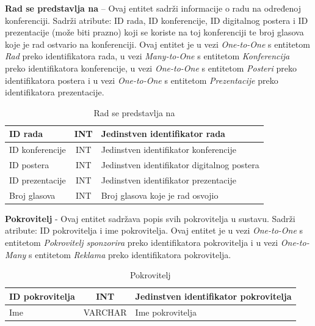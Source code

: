 \textbf{Rad se predstavlja na} – Ovaj entitet sadrži informacije o radu na određenoj konferenciji. Sadrži atribute: ID rada, ID konferencije, ID digitalnog postera i ID prezentacije (može biti prazno) koji se koriste na toj konferenciji te broj glasova koje je rad ostvario na konferenciji. Ovaj entitet je u vezi \textit{One-to-One} s entitetom \textit{Rad} preko identifikatora rada, u vezi \textit{Many-to-One} s entitetom \textit{Konferencija} preko identifikatora konferencije, u vezi \textit{One-to-One} s entitetom \textit{Posteri} preko identifikatora postera i u vezi \textit{One-to-One} s entitetom \textit{Prezentacije} preko identifikatora prezentacije.

\begin{table}[H]
	\caption{Rad se predstavlja na}
	\label{tbl:radSePredstavljaNa}
	\centering
	\begin{tabular}{|l|c|l|} 
		\hline
		\cellcolor{lightblue}ID rada & INT & Jedinstven identifikator rada\\ 
		\hline
		\cellcolor{lightblue}ID konferencije & INT & Jedinstven identifikator konferencije\\ 
		\hline
		\cellcolor{lightblue}ID postera & INT & Jedinstven identifikator digitalnog postera\\ 
		\hline
		\cellcolor{lightblue}ID prezentacije & INT & Jedinstven identifikator prezentacije\\ 
		\hline
		Broj glasova & INT & Broj glasova koje je rad osvojio\\ 
		\hline
	\end{tabular}
\end{table}

\textbf{Pokrovitelj} - Ovaj entitet sadržava popis svih pokrovitelja u sustavu. Sadrži atribute: ID pokrovitelja i ime pokrovitelja. Ovaj entitet je u vezi \textit{One-to-One} s entitetom \textit{Pokrovitelj sponzorira} preko identifikatora pokrovitelja i u vezi \textit{One-to-Many} s entitetom \textit{Reklama} preko identifikatora pokrovitelja.

\begin{table}[H]
	\caption{Pokrovitelj}
	\label{tbl:pokrovitelj}
	\centering
	\begin{tabular}{|l|c|l|} 
		\hline
		\cellcolor{lightgreen}ID pokrovitelja & INT & Jedinstven identifikator pokrovitelja\\ 
		\hline
		Ime & VARCHAR & Ime pokrovitelja\\ 
		\hline
	\end{tabular}
\end{table}


